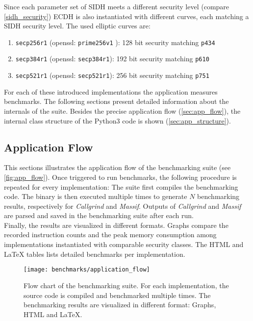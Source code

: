 Since each parameter set of \gls{SIDH} meets a different security level (compare \autoref{sidh_security}) \gls{ECDH} is also instantiated with different curves, each matching a \gls{SIDH} security level. The used elliptic curves are:
\begin{enumerate}
\item \texttt{secp256r1} (openssl: \texttt{prime256v1} \parencite{turner2009elliptic}): 128 bit security matching \texttt{p434} \parencite{brown2010sec}
\item \texttt{secp384r1} (openssl: \texttt{secp384r1}): 192 bit security matching \texttt{p610} \parencite{brown2010sec}
\item \texttt{secp521r1} (openssl: \texttt{secp521r1}): 256 bit security  matching \texttt{p751} \parencite{brown2010sec}
\end{enumerate}
For each of these introduced implementations the application measures benchmarks. The following sections present detailed information about the internals of the suite. Besides the precise application flow (\autoref{sec:app_flow}), the internal class structure of the Python3 code is shown (\autoref{sec:app_structure}).

\subsection{Application Flow}\label{sec:app_flow}
This sections illustrates the application flow of the benchmarking suite (see \autoref{fig:app_flow}). Once triggered to run benchmarks, the following procedure is repeated for every implementation: The suite first compiles the benchmarking code. The binary is then executed multiple times to generate $N$ benchmarking results, respectively for \textit{Callgrind} and \textit{Massif}. Outputs of \textit{Callgrind} and \textit{Massif} are parsed and saved in the benchmarking suite after each run.
\\
Finally, the results are visualized in different formats. Graphs compare the recorded instruction counts and the peak memory consumption among implementations instantiated with comparable security classes. The \gls{HTML} and LaTeX tables lists detailed benchmarks per implementation.

\begin{figure}[H]
  \centering
  \texttt{[image: benchmarks/application\_flow]}
  \caption[Flow chart of the benchmarking suite.]
  {Flow chart of the benchmarking suite. For each implementation, the source code is compiled and benchmarked multiple times. The benchmarking results are visualized in different format: Graphs, \gls{HTML} and LaTeX.
  } \label{fig:app_flow}
\end{figure}




